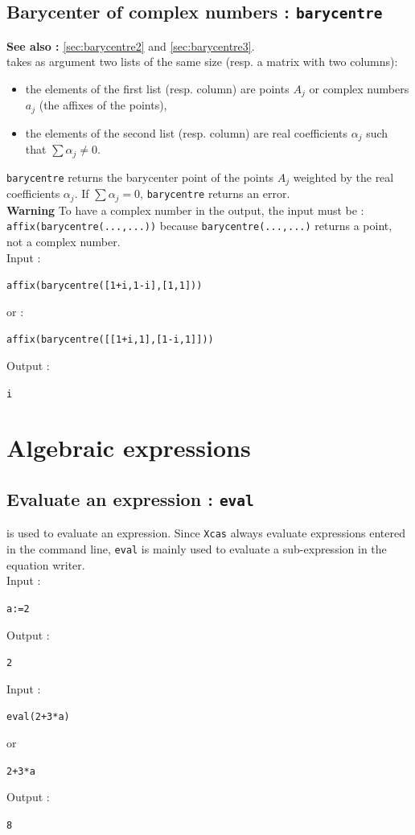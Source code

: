 \documentclass[a4paper,11pt]{book}
\begin{document}
\subsection{Barycenter of complex numbers : {\tt barycentre}}\label{sec:baryc}
{\bf See also :} \ref{sec:barycentre2} and \ref{sec:barycentre3}.\\
 takes as argument two lists of the same size
(resp. a matrix with two columns): 
\begin{itemize}
\item the elements of the first list (resp. column) 
are points $A_j$ or complex numbers $a_j$ (the affixes of the points),
\item the elements of the second list (resp. column) are real coefficients 
$\alpha_j$ such that $\sum \alpha_j \neq 0$.
\end{itemize}
{\tt barycentre} returns the barycenter point of the  points $A_j$ 
weighted by the real coefficients  $\alpha_j$.
If $\sum \alpha_j = 0$, {\tt barycentre} returns an
error.\\
{\bf Warning} To have a complex number in the output, the input must be :\\
{\tt affix(barycentre(...,...))} 
because {\tt barycentre(...,...)} returns a point, not a complex number.\\
Input :
\begin{center}{\tt affix(barycentre([1+i,1-i],[1,1]))}\end{center}
or :
\begin{center}{\tt affix(barycentre([[1+i,1],[1-i,1]]))}\end{center}
Output :
\begin{center}{\tt i}\end{center}

\section{Algebraic expressions}
\subsection{Evaluate an expression : {\tt eval}}
 is used to evaluate an expression. Since 
{\tt Xcas} always evaluate expressions entered in the command line, 
{\tt eval} is mainly used 
to evaluate a sub-expression in the equation writer.\\
Input :
\begin{center}{\tt a:=2}\end{center}
Output :
\begin{center}{\tt 2}\end{center}
Input :
\begin{center}{\tt eval(2+3*a)}\end{center}
or
\begin{center}{\tt 2+3*a}\end{center}
Output :
\begin{center}{\tt 8}\end{center}
\end{document}
